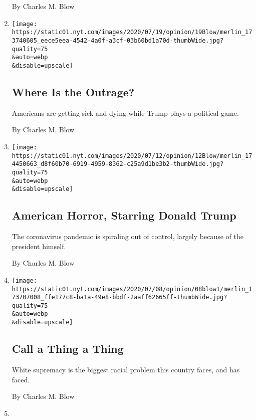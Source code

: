\begin{enumerate}
  By Charles M. Blow
\item
  \href{/2020/07/19/opinion/trump-coronavirus-us.html}{}

  \texttt{[image: https://static01.nyt.com/images/2020/07/19/opinion/19Blow/merlin\_173740605\_eece5eea-4542-4a0f-a3cf-03b60bd1a70d-thumbWide.jpg?quality=75\\\&auto=webp\\\&disable=upscale]}

  \hypertarget{where-is-the-outrage}{%
  \subsection{Where Is the Outrage?}\label{where-is-the-outrage}}

  Americans are getting sick and dying while Trump plays a political
  game.

  By Charles M. Blow
\item
  \href{/2020/07/12/opinion/coronavirus-donald-trump.html}{}

  \texttt{[image: https://static01.nyt.com/images/2020/07/12/opinion/12Blow/merlin\_174450663\_d8f60b70-6919-4959-8362-c25a9d1be3b2-thumbWide.jpg?quality=75\\\&auto=webp\\\&disable=upscale]}

  \hypertarget{american-horror-starring-donald-trump}{%
  \subsection{American Horror, Starring Donald
  Trump}\label{american-horror-starring-donald-trump}}

  The coronavirus pandemic is spiraling out of control, largely because
  of the president himself.

  By Charles M. Blow
\item
  \href{/2020/07/08/opinion/racism-united-states.html}{}

  \texttt{[image: https://static01.nyt.com/images/2020/07/08/opinion/08blow1/merlin\_173707008\_ffe177c8-ba1a-49e8-bbdf-2aaff62665ff-thumbWide.jpg?quality=75\\\&auto=webp\\\&disable=upscale]}

  \hypertarget{call-a-thing-a-thing}{%
  \subsection{Call a Thing a Thing}\label{call-a-thing-a-thing}}

  White supremacy is the biggest racial problem this country faces, and
  has faced.

  By Charles M. Blow
\item
  \href{/2020/07/05/opinion/trump-monuments.html}{}


\end{enumerate}
